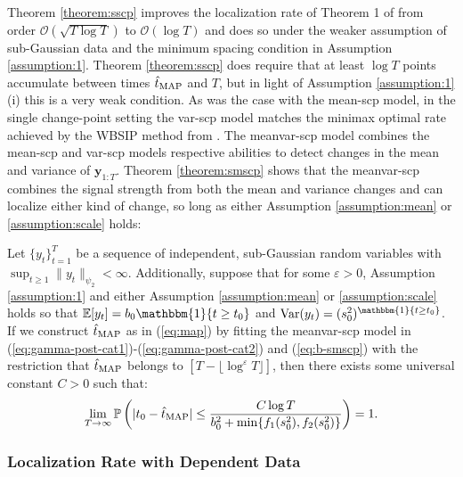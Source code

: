 Theorem \ref{theorem:sscp} improves the localization rate of Theorem 1 of \cite{Cappello22} from order $\mathcal{O}(\sqrt{T\log T})$ to $\mathcal{O}(\log T)$ and does so under the weaker assumption of sub-Gaussian data and the minimum spacing condition in Assumption \ref{assumption:1}. Theorem \ref{theorem:sscp} does require that at least $\log T$ points accumulate between times $\hat{t}_{\normalfont \text{MAP}}$ and $T$, but in light of Assumption \ref{assumption:1} (i) this is a very weak condition. As was the case with the mean-scp model, in the single change-point setting the var-scp model matches the minimax optimal rate achieved by the WBSIP method from \cite{Wang21}. The meanvar-scp model combines the mean-scp and var-scp models respective abilities to detect changes in the mean and variance of $\mathbf{y}_{1:T}$. Theorem \ref{theorem:smscp} shows that the meanvar-scp combines the signal strength from both the mean and variance changes and can localize either kind of change, so long as either Assumption \ref{assumption:mean} or \ref{assumption:scale} holds:

\begin{theorem}\label{theorem:smscp}
Let $\{y_t\}_{t=1}^T$ be a sequence of independent, sub-Gaussian random variables with $\sup_{t \geq 1} \lVert y_t\rVert_{\psi_2} < \infty$. Additionally, suppose that for some $\varepsilon >0$, Assumption \ref{assumption:1} and either Assumption \ref{assumption:mean} or \ref{assumption:scale} holds so that $\E[y_t] = b_0\mathbbm{1}\{t\geq t_0\}$ and $\normalfont{\Var}(y_t) = (s_0^2)^{\mathbbm{1}\{t\geq t_0\}}$. If we construct $\hat{t}_{\normalfont \text{MAP}}$ as in (\ref{eq:map}) by fitting the meanvar-scp model in (\ref{eq:gamma-post-cat1})-(\ref{eq:gamma-post-cat2}) and (\ref{eq:b-smscp}) with the restriction that $\hat{t}_{\normalfont \text{MAP}}$ belongs to $[T - \lfloor \log^\varepsilon T\rfloor]$, then there exists some universal constant $C > 0$ such that:
    \vspace{-5pt}
    \begin{align}
        \lim_{T\to\infty}\Pr\left(|t_0 - \hat{t}_{\normalfont \text{MAP}}| \leq \frac{C \log T}{b_0^2 + \min\{f_1(s_0^2),f_2(s_0^2)\}} \right) = 1. \label{eq:thm-3}
    \end{align}
\end{theorem}

\subsubsection{Localization Rate with Dependent Data}

